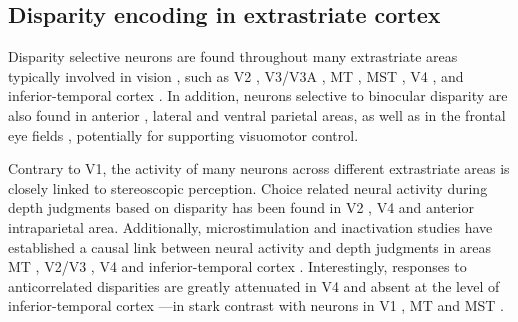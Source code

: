 \subsection{Disparity encoding in extrastriate cortex}

Disparity selective neurons are found throughout many extrastriate areas typically involved in vision \cite{Gonzalez:1998le,Neri:2005oq,Parker:2007nx}, such as V2 \cite{Hubel:1970dq,Poggio:1977ys}, V3/V3A \cite{Zeki:1978uf,Anzai:2011gb}, MT \cite{DeAngelis:1998df,DeAngelis:1999fk}, MST \cite{Eifuku:1999cr}, V4 \cite{Shiozaki:2012ys,Umeda:2007vn,Tanabe:2005qf,Watanabe:2002kx}, and inferior-temporal cortex \cite{Uka:2000cr,Janssen:2003fk,Janssen:2000oq,Janssen:1999nx}. In addition, neurons selective to binocular disparity are also found in anterior \cite{Verhoef:2015cz,Verhoef:2010gb,Srivastava:2009oa}, lateral \cite{Gnadt:1995tg,Genovesio:2004kl} and ventral \cite{Colby:1993oq} parietal areas, as well as in the frontal eye fields \cite{Ferraina:2000nx}, potentially for supporting visuomotor control.

Contrary to V1, the activity of many neurons across different extrastriate areas is closely linked to stereoscopic perception. Choice related neural activity during depth judgments based on disparity has been found in V2 \cite{Clery:2015lh,Nienborg:2007ly,Nienborg:2006qo}, V4 \cite{Shiozaki:2012ys} and anterior intraparietal area\cite{Verhoef:2015cz}. Additionally, microstimulation and inactivation studies have established a causal link between neural activity and depth judgments in areas MT \cite{DeAngelis:1998df}, V2/V3 \cite{Smolyanskaya:2015ve}, V4 \cite{Shiozaki:2012ys} and inferior-temporal cortex \cite{Verhoef:2012dg}. Interestingly, responses to anticorrelated disparities are greatly attenuated in V4 \cite{Tanabe:2004mw} and absent at the level of inferior-temporal cortex \cite{Janssen:2003fk}---in stark contrast with neurons in V1 \cite{Cumming:1997ve}, MT \cite{Krug:2004fk} and MST \cite{Takemura:2001bd}.


